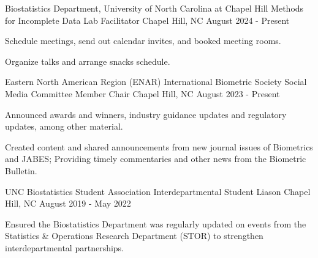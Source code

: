 

\begin{cventries}

  \cventry
    {Biostatistics Department, University of North Carolina at Chapel Hill} %
    {Methods for Incomplete Data Lab Facilitator} %
    {Chapel Hill, NC} %
    {August 2024 - Present} %
    {
      \begin{cvitems} 
        \item Schedule meetings, send out calendar invites, and booked meeting rooms.
        \item Organize talks and arrange snacks schedule.
      \end{cvitems}
    }

  \cventry
    {Eastern North American Region (ENAR) International Biometric Society} %
    {Social Media Committee Member Chair} %
    {Chapel Hill, NC} %
    {August 2023 - Present} %
    {
      \begin{cvitems} %
        \item Announced awards and winners, industry guidance updates and regulatory updates, among other material.
        \item Created content and shared announcements from new journal issues of Biometrics and JABES; Providing timely commentaries \newline and other news from the Biometric Bulletin.
      \end{cvitems}
    }
  \cventry
    {UNC Biostatistics Student Association} %
    {Interdepartmental Student Liason} %
    {Chapel Hill, NC} %
    {August 2019 - May 2022} %
    {
      \begin{cvitems} %
        \item Ensured the Biostatistics Department was regularly updated on events from the \newline Statistics \& Operations Research Department (STOR) to strengthen interdepartmental partnerships.
      \end{cvitems}
    }


\end{cventries}
